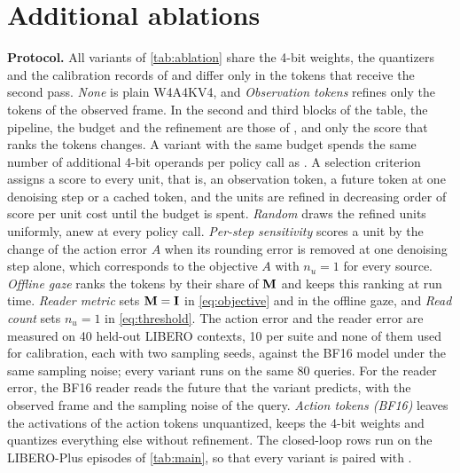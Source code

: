 \section{Additional ablations}
\label{sec:supp:ablation}

\noindent\textbf{Protocol.}
All variants of \cref{tab:ablation} share the 4-bit weights, the quantizers and the calibration records of \method and differ only in the tokens that receive the second pass.
\emph{None} is plain W4A4KV4, and \emph{Observation tokens} refines only the tokens of the observed frame.
In the second and third blocks of the table, the pipeline, the budget and the refinement are those of \method, and only the score that ranks the tokens changes.
A variant with the same budget spends the same number of additional 4-bit operands per policy call as \method.
A selection criterion assigns a score to every unit, that is, an observation token, a future token at one denoising step or a cached token, and the units are refined in decreasing order of score per unit cost until the budget is spent.
\emph{Random} draws the refined units uniformly, anew at every policy call.
\emph{Per-step sensitivity} scores a unit by the change of the action error $A$ when its rounding error is removed at one denoising step alone, which corresponds to the objective $A$ with $n_u = 1$ for every source.
\emph{Offline gaze} ranks the tokens by their share of $\mathbf{M}$ and keeps this ranking at run time.
\emph{Reader metric} sets $\mathbf{M} = \mathbf{I}$ in \cref{eq:objective} and in the offline gaze, and \emph{Read count} sets $n_u = 1$ in \cref{eq:threshold}.
The action error and the reader error are measured on 40 held-out LIBERO contexts, 10 per suite and none of them used for calibration, each with two sampling seeds, against the BF16 model under the same sampling noise; every variant runs on the same 80 queries.
For the reader error, the BF16 reader reads the future that the variant predicts, with the observed frame and the sampling noise of the query.
\emph{Action tokens (BF16)} leaves the activations of the action tokens unquantized, keeps the 4-bit weights and quantizes everything else without refinement.
The closed-loop rows run on the LIBERO-Plus episodes of \cref{tab:main}, so that every variant is paired with \method.

